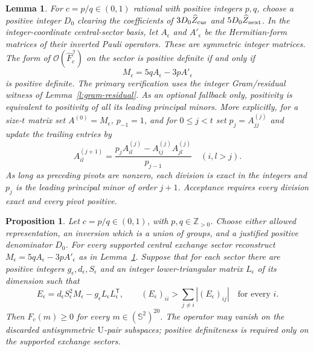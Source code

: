 \documentclass[11pt,reqno]{amsart}
\newtheorem{lemma}[theorem]{Lemma}
\newtheorem{proposition}[theorem]{Proposition}
\theoremstyle{definition}
\theoremstyle{remark}
\begin{document}
\begin{lemma}\label{l:integercheck}
For \(c=p/q\in(0,1)\) rational with positive integers \(p,q\),
choose a positive integer \(D_0\) clearing the coefficients of
\(3D_0\widehat Z_{\rm cur}\) and \(5D_0\widehat Z_{\rm next}\).
In the integer-coordinate central-sector basis, let \(A_\epsilon\)
and \(A'_\epsilon\) be the Hermitian-form matrices of their
inverted Pauli operators. These are symmetric integer matrices.
The form of \(\mathcal O(\widehat F_c^{\mathcal I})\) on the sector
is positive definite if and only if
\[
 M_\epsilon=5qA_\epsilon-3pA'_\epsilon
\]
is positive definite. The primary verification uses the integer
Gram/residual witness of Lemma~\ref{l:gram-residual}.
As an optional fallback only, positivity is equivalent to positivity of all its
leading principal minors. More explicitly, for a size-\(t\) matrix
set \(A^{(0)}=M_\epsilon\), \(p_{-1}=1\), and for \(0\le j<t\)
set \(p_j=A^{(j)}_{jj}\) and update the trailing entries by
\[
 A^{(j+1)}_{il}
    =\frac{p_jA^{(j)}_{il}-A^{(j)}_{ij}A^{(j)}_{jl}}{p_{j-1}}
       \quad(i,l>j).
\]
As long as preceding pivots are nonzero, each division is exact
in the integers and \(p_j\) is the leading principal minor of
order \(j+1\). Acceptance requires every division exact and every
pivot positive.
\end{lemma}

\begin{proposition}\label{p:certificate}
Let \(c=p/q\in(0,1)\), with \(p,q\in\mathbb Z_{>0}\).
Choose either allowed representation, an inversion which is a
union of groups, and a justified positive denominator \(D_0\).
For every supported central exchange sector reconstruct
\(M_\epsilon=5qA_\epsilon-3pA'_\epsilon\) as in
Lemma~\ref{l:integercheck}.
Suppose that for each sector there are positive integers
\(g_\epsilon,d_\epsilon,S_\epsilon\) and an integer lower-triangular
matrix \(L_\epsilon\) of its dimension such that
\[
 E_\epsilon=d_\epsilon S_\epsilon^2M_\epsilon
                  -g_\epsilon L_\epsilon L_\epsilon^{\mathsf T},
 \qquad
 (E_\epsilon)_{ii}>
          \sum_{j\ne i}|(E_\epsilon)_{ij}|\quad\text{for every }i.
\]
Then \(F_c(m)\ge0\) for every \(m\in(\mathbb S^2)^{20}\).
The operator may vanish on the discarded antisymmetric
\(\mathrm U\)-pair subspaces; positive definiteness is required
only on the supported exchange sectors.
\end{proposition}
\end{document}
